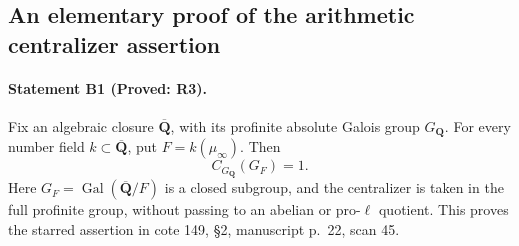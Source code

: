 \subsection{An elementary proof of the arithmetic centralizer assertion}

\paragraph{Statement B1 (Proved: R3).}\label{res:B1}
Fix an algebraic closure $\overline{\mathbf Q}$, with its profinite absolute
Galois group $G_{\mathbf Q}$. For every number field
$k\subset\overline{\mathbf Q}$, put $F=k(\mu_\infty)$. Then
\[
 C_{G_{\mathbf Q}}(G_F)=1.
\]
Here $G_F=\operatorname{Gal}(\overline{\mathbf Q}/F)$ is a closed subgroup,
and the centralizer is taken in the full profinite group, without passing to
an abelian or pro-$\ell$ quotient. This proves the starred assertion in
cote 149, \S2, manuscript p.~22, scan 45.

